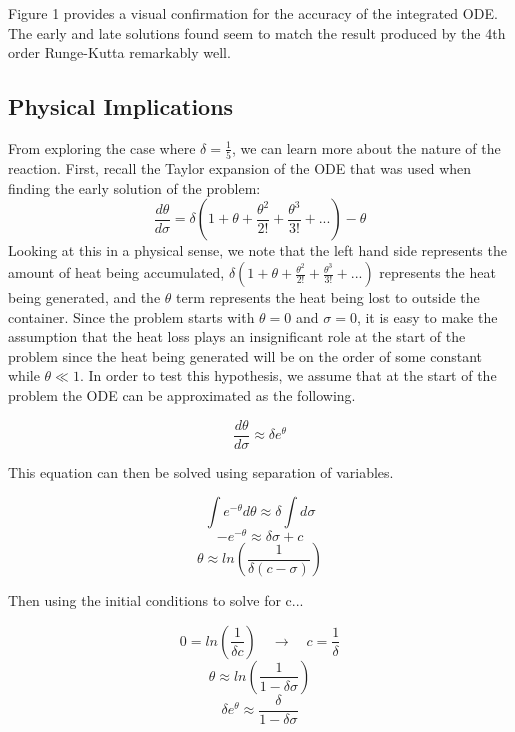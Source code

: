 \documentclass[12pt]{article}\pagestyle{myheadings}
\theoremstyle{plain}
\begin{document}
Figure 1 provides a visual confirmation for the accuracy of the integrated ODE. The early and late solutions found seem to match the result produced by the 4th order Runge-Kutta remarkably well.

\subsection{Physical Implications}
From exploring the case where $\delta = \frac{1}{5}$, we can learn more about the nature of the reaction. First, recall the Taylor expansion of the ODE that was used when finding the early solution of the problem: 
\[\frac{d\theta}{d\sigma} = \delta \left(1 + \theta + \frac{\theta^{2}}{2!} + \frac{\theta^{3}}{3!} + ...\right) - \theta\]
Looking at this in a physical sense, we note that the left hand side represents the amount of heat being accumulated, $\delta \left(1 + \theta + \frac{\theta^{2}}{2!} + \frac{\theta^{3}}{3!} + ...\right)$ represents the heat being generated, and the $\theta$ term represents the heat being lost to outside the container. Since the problem starts with $\theta = 0$ and $\sigma = 0$, it is easy to make the assumption that the heat loss plays an insignificant role at the start of the problem since the heat being generated will be on the order of some constant while $\theta \ll 1$. In order to test this hypothesis, we assume that at the start of the problem the ODE can be approximated as the following.

\[\frac{d\theta}{d\sigma} \approx \delta e^{\theta}\]

This equation can then be solved using separation of variables.

\[\int e^{-\theta} d\theta \approx \delta \int d\sigma\]
\[-e^{-\theta} \approx \delta \sigma + c\]
\[\theta \approx ln\left(\frac{1}{\delta(c - \sigma)}\right)\]

Then using the initial conditions to solve for c...

\[0 = ln\left(\frac{1}{\delta c}\right) \quad \rightarrow \quad c = \frac{1}{\delta}\]
\begin{equation} \label{eq:fizzHeatLoss}
\theta \approx ln\left(\frac{1}{1 - \delta \sigma}\right)
\end{equation}
\begin{equation} \label{eq:fizzHeatGain}
\delta e^{\theta} \approx \frac{\delta}{1 - \delta \sigma}
\end{equation}
\end{document}
